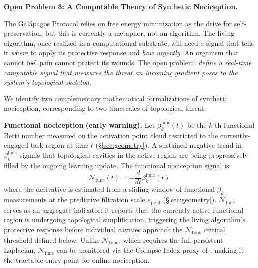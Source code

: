 \documentclass{article}
\begin{document}
\bigskip
\noindent\textbf{Open Problem 3: A Computable Theory of Synthetic Nociception.}

The Galápagos Protocol relies on free energy minimization as the drive for self-preservation, but this is currently a metaphor, not an algorithm. The living algorithm, once realized in a computational substrate, will need a signal that tells it \emph{where} to apply its protective response and \emph{how urgently}. An organism that cannot feel pain cannot protect its wounds. The open problem: \emph{define a real-time computable signal that measures the threat an incoming gradient poses to the system's topological skeleton.}

We identify two complementary mathematical formalizations of synthetic nociception, corresponding to two timescales of topological threat:

\medskip
\noindent\textbf{Functional nociception (early warning).}
Let $\beta_k^{\text{func}}(t)$ be the $k$-th functional Betti number measured on the activation point cloud restricted to the currently-engaged task region at time $t$ (\S\ref{sec:geometry}). A sustained negative trend in $\beta_k^{\text{func}}$ signals that topological cavities in the active region are being progressively filled by the ongoing learning update. The functional nociception signal is:
\begin{equation}
\mathcal{N}_{\text{func}}(t) = -\frac{d}{dt}\beta_k^{\text{func}}(t)
\end{equation}
where the derivative is estimated from a sliding window of functional $\beta_k$ measurements at the predictive filtration scale $\varepsilon_{\text{pred}}$ (\S\ref{sec:geometry}). $\mathcal{N}_{\text{func}}$ serves as an aggregate indicator: it reports that the currently active functional region is undergoing topological simplification, triggering the living algorithm's protective response before individual cavities approach the $\mathcal{N}_{\text{topo}}$ critical threshold defined below. Unlike $\mathcal{N}_{\text{topo}}$, which requires the full persistent Laplacian, $\mathcal{N}_{\text{func}}$ can be monitored via the Collapse Index proxy of \citet{Kalinowski2026collapse}, making it the tractable entry point for online nociception.
\end{document}
